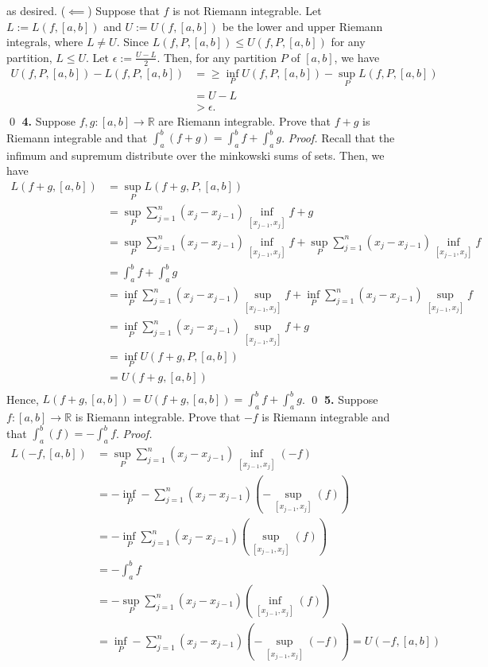 \documentclass{article}
\begin{document}
as desired.
\newline
\newline
($\impliedby$) Suppose that $f$ is not Riemann integrable. Let $L:=L(f,[a,b])$ and $U:=U(f,[a,b])$ be the lower and upper Riemann integrals, where $L\neq U$. Since $L(f,P,[a,b])\leq U(f,P,[a,b])$ for any partition, $L\leq U$. Let $\epsilon:=\frac{U-L}2$. Then, for any partition $P$ of $[a,b]$, we have 
\begin{align*}
    U(f,P,[a,b])-L(f,P,[a,b])&=\geq \underset{P}{\inf}U(f,P,[a,b])-\underset{P}{\sup}L(f,P,[a,b])\\
    &= U-L\\
    &>\epsilon.
\end{align*}
\qed
\newpage \noindent
\textbf{4. }Suppose $f,g:[a,b]\rightarrow \mathbb{R}$ are Riemann integrable. Prove that $f+g$ is Riemann integrable and that $\int_{a}^{b}(f+g)=\int_{a}^{b}f+\int_{a}^{b}g$. 
\newline
\textit{Proof.} Recall that the infimum and supremum distribute over the minkowski sums of sets. Then, we have
\begin{align*}
    L(f+g,[a,b])&=\underset{P}{\sup} L(f+g,P,[a,b])\\
    &=\underset{P}{\sup} \sum_{j=1}^{n} (x_j-x_{j-1})\underset{[x_{j-1},x_j]}{\inf} f+g\\
    &=\underset{P}{\sup} \sum_{j=1}^{n} (x_j-x_{j-1})\underset{[x_{j-1},x_j]}{\inf} f +\underset{P}{\sup} \sum_{j=1}^{n} (x_j-x_{j-1})\underset{[x_{j-1},x_j]}{\inf} f\\
    &= \int_{a}^{b}f+\int_{a}^{b}g\\
    &= \underset{P}{\inf} \sum_{j=1}^{n} (x_j-x_{j-1})\underset{[x_{j-1},x_j]}{\sup} f +\underset{P}{\inf} \sum_{j=1}^{n} (x_j-x_{j-1})\underset{[x_{j-1},x_j]}{\sup} f\\
    &=\underset{P}{\inf} \sum_{j=1}^{n} (x_j-x_{j-1})\underset{[x_{j-1},x_j]}{\sup} f+g\\
    &=\underset{P}{\inf} U(f+g,P,[a,b])\\
    &=U(f+g,[a,b])\\
\end{align*}
Hence, $L(f+g,[a,b])=U(f+g,[a,b])=\int_{a}^{b}f+\int_{a}^{b}g$. \qed
\newline
\noindent
\textbf{5. }Suppose $f:[a,b]\rightarrow \mathbb{R}$ is Riemann integrable. Prove that $-f$ is Riemann integrable and that $\int_{a}^{b}(f)=-\int_{a}^{b}f$. 
\newline
\textit{Proof.} 
\begin{align*}
    L(-f,[a,b])&=\underset{P}{\sup} \sum_{j=1}^{n} (x_j-x_{j-1})\underset{[x_{j-1},x_j]}{\inf} (-f)\\
    &=-\underset{P}{\inf} -\sum_{j=1}^{n} (x_j-x_{j-1})(-\underset{[x_{j-1},x_j]}{\sup} (f))\\
    &=-\underset{P}{\inf} \sum_{j=1}^{n} (x_j-x_{j-1})(\underset{[x_{j-1},x_j]}{\sup} (f))\\
    &=-\int_{a}^{b}f\\
    &=-\underset{P}{\sup} \sum_{j=1}^{n} (x_j-x_{j-1})(\underset{[x_{j-1},x_j]}{\inf} (f))\\
    &=\underset{P}{\inf} -\sum_{j=1}^{n} (x_j-x_{j-1})(-\underset{[x_{j-1},x_j]}{\sup} (-f))=U(-f,[a,b])
\end{align*}
\end{document}
